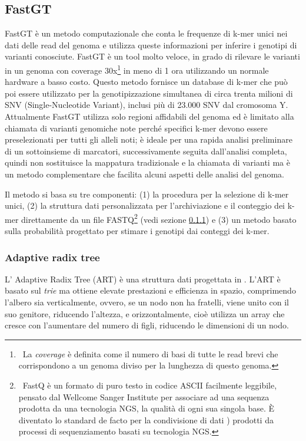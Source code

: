 \documentclass[../main.tex]{subfiles}
\begin{document}
\subsection{FastGT}
\label{fastgt}

FastGT \cite{pajuste2017fastgt} è un metodo computazionale che conta le frequenze di k-mer unici nei dati delle read del genoma e utilizza queste informazioni per inferire i genotipi di varianti conosciute. FastGT è un tool molto veloce, in grado di rilevare le varianti in un genoma con coverage 30x\footnote{\ La \textit{coverage} è definita come il numero di basi di tutte le read brevi che corrispondono a un genoma diviso per la lunghezza di questo genoma.} in meno di 1 ora utilizzando un normale hardware a basso costo. Questo metodo fornisce un database di k-mer che può poi essere utilizzato per la genotipizzazione simultanea di circa trenta milioni di SNV (Single-Nucleotide Variant), inclusi più di 23.000 SNV dal cromosoma Y. Attualmente FastGT utilizza solo regioni affidabili del genoma ed è limitato alla chiamata di varianti genomiche note perché specifici k-mer devono essere preselezionati per tutti gli alleli noti; è ideale per una rapida analisi preliminare di un sottoinsieme di marcatori, successivamente seguita dall'analisi completa, quindi non sostituisce la mappatura tradizionale e la chiamata di varianti ma è un metodo complementare che facilita alcuni aspetti delle analisi del genoma.

Il metodo si basa su tre componenti: (1) la procedura per la selezione di k-mer unici, (2) la struttura dati personalizzata per l'archiviazione e il conteggio dei k-mer direttamente da un file FASTQ\footnote{\ FastQ è un formato di puro testo in codice ASCII facilmente leggibile, pensato dal Wellcome Sanger Institute per associare ad una sequenza prodotta da una tecnologia NGS, la qualità di ogni sua singola base. È diventato lo standard de facto per la condivisione di dati \cite{cock2010sanger} \label{nota:FASTQ}) prodotti da processi di sequenziamento basati su tecnologia NGS.} (vedi sezione \ref{AdaptiveRadixTree}) e (3) un metodo basato sulla probabilità progettato per stimare i genotipi dai conteggi dei k-mer.

\subsubsection{Adaptive radix tree}
\label{AdaptiveRadixTree}

L' Adaptive Radix Tree (ART) è una struttura dati progettata in \cite{leis2013art}. L'ART è basato sul \textit{trie} ma ottiene elevate prestazioni e efficienza in spazio, comprimendo l'albero sia verticalmente, ovvero, se un nodo non ha fratelli, viene unito con il suo genitore, riducendo l'altezza, e orizzontalmente, cioè utilizza un array che cresce con l'aumentare del numero di figli, riducendo le dimensioni di un nodo.
\end{document}
